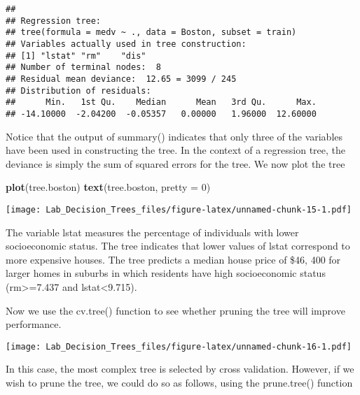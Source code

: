 \documentclass[]{article}
\newenvironment{Shaded}{\begin{snugshade}}{\end{snugshade}}
\newcommand{\KeywordTok}[1]{\textcolor[rgb]{0.13,0.29,0.53}{\textbf{#1}}}
\newcommand{\DataTypeTok}[1]{\textcolor[rgb]{0.13,0.29,0.53}{#1}}
\newcommand{\DecValTok}[1]{\textcolor[rgb]{0.00,0.00,0.81}{#1}}
\newcommand{\StringTok}[1]{\textcolor[rgb]{0.31,0.60,0.02}{#1}}
\newcommand{\OperatorTok}[1]{\textcolor[rgb]{0.81,0.36,0.00}{\textbf{#1}}}
\newcommand{\NormalTok}[1]{#1}
\begin{document}
\begin{verbatim}
## 
## Regression tree:
## tree(formula = medv ~ ., data = Boston, subset = train)
## Variables actually used in tree construction:
## [1] "lstat" "rm"    "dis"  
## Number of terminal nodes:  8 
## Residual mean deviance:  12.65 = 3099 / 245 
## Distribution of residuals:
##      Min.   1st Qu.    Median      Mean   3rd Qu.      Max. 
## -14.10000  -2.04200  -0.05357   0.00000   1.96000  12.60000
\end{verbatim}

Notice that the output of summary() indicates that only three of the
variables have been used in constructing the tree. In the context of a
regression tree, the deviance is simply the sum of squared errors for
the tree. We now plot the tree

\begin{Shaded}
\begin{Highlighting}[]
\KeywordTok{plot}\NormalTok{(tree.boston)}
\KeywordTok{text}\NormalTok{(tree.boston, }\DataTypeTok{pretty =} \DecValTok{0}\NormalTok{)}
\end{Highlighting}
\end{Shaded}

\texttt{[image: Lab\_Decision\_Trees\_files/figure-latex/unnamed-chunk-15-1.pdf]}

The variable lstat measures the percentage of individuals with lower
socioeconomic status. The tree indicates that lower values of lstat
correspond to more expensive houses. The tree predicts a median house
price of \$46, 400 for larger homes in suburbs in which residents have
high socioeconomic status (rm\textgreater{}=7.437 and
lstat\textless{}9.715).

Now we use the cv.tree() function to see whether pruning the tree will
improve performance.

\begin{Shaded}
\end{Shaded}

\texttt{[image: Lab\_Decision\_Trees\_files/figure-latex/unnamed-chunk-16-1.pdf]}

In this case, the most complex tree is selected by cross validation.
However, if we wish to prune the tree, we could do so as follows, using
the prune.tree() function
\end{document}
